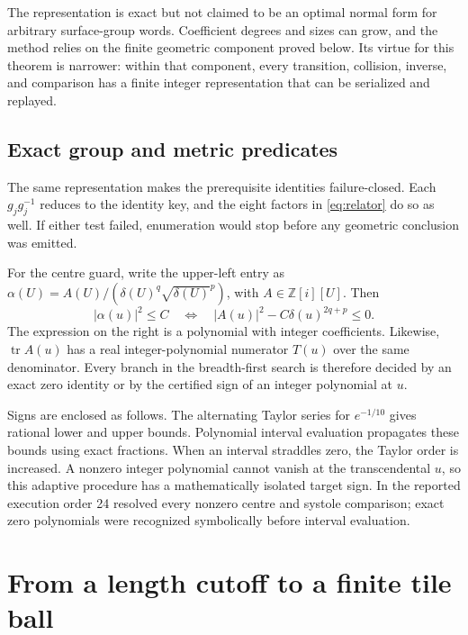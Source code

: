 \documentclass[11pt,a4paper]{article}
\theoremstyle{definition}
\newcommand{\Z}{\mathbb Z}
\newcommand{\tr}{\operatorname{tr}}
\begin{document}
The representation is exact but not claimed to be an optimal normal form for
arbitrary surface-group words.  Coefficient degrees and sizes can grow, and
the method relies on the finite geometric component proved below.  Its virtue
for this theorem is narrower: within that component, every transition,
collision, inverse, and comparison has a finite integer representation that
can be serialized and replayed.

\subsection{Exact group and metric predicates}

The same representation makes the prerequisite identities failure-closed.
Each \(g_jg_j^{-1}\) reduces to the identity key, and the eight factors in
\eqref{eq:relator} do so as well.  If either test failed, enumeration would
stop before any geometric conclusion was emitted.

For the centre guard, write the upper-left entry as
\(\alpha(U)=A(U)/(\delta(U)^q\sqrt{\delta(U)}^p)\), with
\(A\in\Z[i][U]\).  Then
\begin{equation}\label{eq:center-poly}
 |\alpha(u)|^2\leq C
 \quad\Longleftrightarrow\quad
 |A(u)|^2-C\delta(u)^{2q+p}\leq0.
\end{equation}
The expression on the right is a polynomial with integer coefficients.
Likewise, \(\tr A(u)\) has a real integer-polynomial numerator \(T(u)\) over
the same denominator.  Every branch in the breadth-first search is therefore
decided by an exact zero identity or by the certified sign of an integer
polynomial at \(u\).

Signs are enclosed as follows.  The alternating Taylor series for
\(e^{-1/10}\) gives rational lower and upper bounds.  Polynomial interval
evaluation propagates these bounds using exact fractions.  When an interval
straddles zero, the Taylor order is increased.  A nonzero integer polynomial
cannot vanish at the transcendental \(u\), so this adaptive procedure has a
mathematically isolated target sign.  In the reported execution order 24
resolved every nonzero centre and systole comparison; exact zero polynomials
were recognized symbolically before interval evaluation.

\section{From a length cutoff to a finite tile ball}
\label{sec:completeness}
\end{document}

